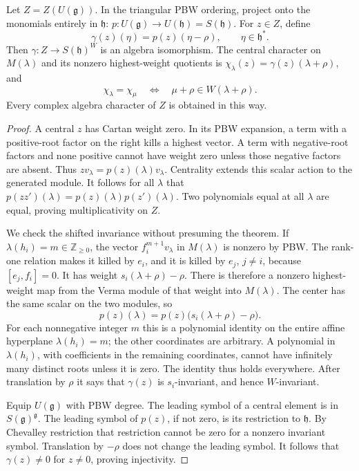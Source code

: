 \begin{theorem}
\label{res:H08}
Let \(Z=Z(U(\mathfrak g))\). In the triangular PBW ordering,
project onto the monomials entirely in \(\mathfrak h\):
\(p:U(\mathfrak g)\to U(\mathfrak h)=S(\mathfrak h)\).
For \(z\in Z\), define
\[
 \gamma(z)(\eta)=p(z)(\eta-\rho),\qquad \eta\in\mathfrak h^*.
\]
Then \(\gamma:Z\longrightarrow S(\mathfrak h)^W\) is an
algebra isomorphism. The central character on \(M(\lambda)\)
and its nonzero highest-weight quotients is
\(\chi_\lambda(z)=\gamma(z)(\lambda+\rho)\), and
\[
 \chi_\lambda=\chi_\mu
    \quad\Longleftrightarrow\quad
 \mu+\rho\in W(\lambda+\rho).
\]
Every complex algebra character of \(Z\) is obtained in this way.
\end{theorem}
\begin{proof}
A central \(z\) has Cartan weight zero. In its PBW expansion,
a term with a positive-root factor on the right kills a highest
vector. A term with negative-root factors and none positive
cannot have weight zero unless those negative factors are absent.
Thus \(zv_\lambda=p(z)(\lambda)v_\lambda\).
Centrality extends this scalar action to the generated module.
It follows for all \(\lambda\) that
\(p(zz')(\lambda)=p(z)(\lambda)p(z')(\lambda)\).
Two polynomials equal at all \(\lambda\) are equal, proving
multiplicativity on \(Z\).

We check the shifted invariance without presuming the theorem.
If \(\lambda(h_i)=m\in\mathbb Z_{\geq0}\), the vector
\(f_i^{m+1}v_\lambda\) in \(M(\lambda)\) is nonzero by PBW.
The rank-one relation makes it killed by \(e_i\), and it is
killed by \(e_j\), \(j\ne i\), because \([e_j,f_i]=0\).
It has weight \(s_i(\lambda+\rho)-\rho\).
There is therefore a nonzero highest-weight map from the Verma
module of that weight into \(M(\lambda)\).
The center has the same scalar on the two modules, so
\[
 p(z)(\lambda)
    =p(z)\bigl(s_i(\lambda+\rho)-\rho\bigr).
\]
For each nonnegative integer \(m\) this is a polynomial identity
on the entire affine hyperplane \(\lambda(h_i)=m\);
the other coordinates are arbitrary. A polynomial in
\(\lambda(h_i)\), with coefficients in the remaining coordinates,
cannot have infinitely many distinct roots unless it is zero.
The identity thus holds everywhere. After translation by
\(\rho\) it says that \(\gamma(z)\) is \(s_i\)-invariant,
and hence \(W\)-invariant.

Equip \(U(\mathfrak g)\) with PBW degree.
The leading symbol of a central element is in \(S(\mathfrak g)^{\mathfrak g}\).
The leading symbol of \(p(z)\), if not zero, is its restriction
to \(\mathfrak h\). By Chevalley restriction that restriction
cannot be zero for a nonzero invariant symbol. Translation
by \(-\rho\) does not change the leading symbol. It follows that
\(\gamma(z)\ne0\) for \(z\ne0\), proving injectivity.


\end{proof}
